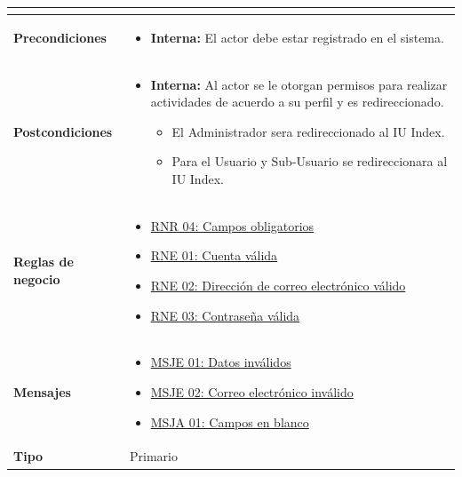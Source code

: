 \begin{center}
\begin{longtable}{| p{3.5cm} | p{11.5cm} |}
\begin{itemize}
            \end{itemize} \\
        \hline	
          \textbf{Precondiciones}& 
            \begin{itemize}
              \item \textbf{Interna:} El actor debe estar registrado en el sistema.
            \end{itemize} \\
        \hline	
          \textbf{Postcondiciones} & 
            \begin{itemize}
              \item \textbf{Interna:} Al actor se le otorgan permisos para realizar actividades de acuerdo a su perfil y es redireccionado. 
		\begin{itemize}
			\item El Administrador sera redireccionado al IU Index.
			\item Para el Usuario y Sub-Usuario se redireccionara al IU Index.
		\end{itemize}
            \end{itemize} \\
       \hline
         \textbf{Reglas de negocio} & 
         	\begin{itemize}
         	  \item {\hyperref[rnr_04]{RNR 04: Campos obligatorios}}
         	  \item {\hyperref[rnr_01]{RNE 01: Cuenta válida}}
         	  \item {\hyperref[rnr_02]{RNE 02: Dirección de correo electrónico válido}}
         	  \item {\hyperref[rnr_03]{RNE 03: Contraseña válida}}
	 \end{itemize} \\
       \hline
         \textbf{Mensajes} & 
         	\begin{itemize}
         	  \item {\hyperref[msje_01]{MSJE 01: Datos inválidos}}
         	  \item {\hyperref[msje_02]{MSJE 02: Correo electrónico inválido}}
         	  \item {\hyperref[msja_01]{MSJA 01: Campos en blanco}}
	 \end{itemize} \\
       \hline
         \textbf{Tipo} & Primario \\
    \hline	    
  \end{longtable}
\end{center}
\endgroup

